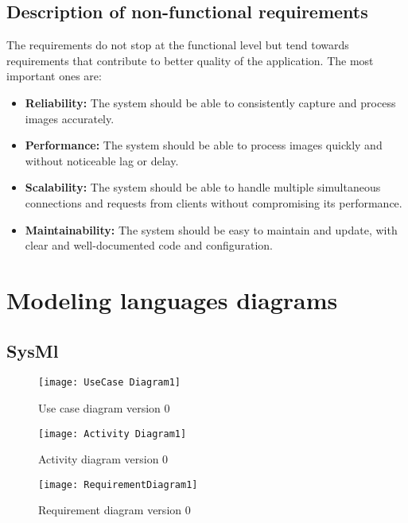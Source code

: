 \subsection{Description of non-functional requirements}
The requirements do not stop at the functional level but tend towards requirements that contribute to better quality of the application. The most important ones are:
\begin{itemize}
\item \textbf{Reliability:} The system should be able to consistently capture and process images accurately.
\item \textbf{Performance:} The system should be able to process images quickly and without noticeable lag or delay.
\item \textbf{Scalability:} The system should be able to handle multiple simultaneous connections and requests from clients without compromising its performance.
\item \textbf{Maintainability:} The system should be easy to maintain and update, with clear and well-documented code and configuration.
\end{itemize}

\section{Modeling languages diagrams}
\subsection{SysMl}

\FloatBarrier
\begin{figure}[h]
\FloatBarrier
         \centering
        \texttt{[image: UseCase Diagram1]}
   
        \caption{Use case diagram version 0}
        \label{Use case diagram version 0}
\FloatBarrier
    \end{figure}


\FloatBarrier

\FloatBarrier
\begin{figure}[h]
\FloatBarrier
         \centering
        \texttt{[image: Activity Diagram1]}
   
        \caption{Activity diagram version 0}
        \label{Activity diagram version 0}
\FloatBarrier
    \end{figure}


\FloatBarrier

\FloatBarrier
\begin{figure}[h]
\FloatBarrier
         \centering
        \texttt{[image: RequirementDiagram1]}
   
        \caption{Requirement diagram version 0}
        \label{Requirement diagram version 0}
\FloatBarrier
    \end{figure}


